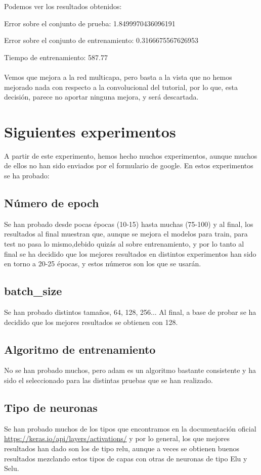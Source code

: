 Podemos ver los resultados obtenidos:

Error sobre el conjunto de prueba: 1.8499970436096191

Error sobre el conjunto de entrenamiento: 0.3166675567626953

Tiempo de entrenamiento: 587.77
\\\\

Vemos que mejora a la red multicapa, pero basta a la vista que no hemos mejorado nada con respecto a la convolucional del tutorial, por lo que, esta decisión, parece no aportar ninguna mejora, y será descartada.

\section{Siguientes experimentos}

A partir de este experimento, hemos hecho muchos experimentos, aunque muchos de ellos no han sido enviados por el formulario de google. En estos experimentos se ha probado:

\subsection{Número de epoch}

Se han probado desde pocas épocas (10-15) hasta muchas (75-100) y al final, los resultados al final muestran que, aunque se mejora el modelos para train, para test no pasa lo mismo,debido quizás al sobre entrenamiento, y por lo tanto al final se ha decidido que los mejores resultados en distintos experimentos han sido en torno a 20-25 épocas, y estos números son los que se usarán.

\subsection{batch\_size}

Se han probado distintos tamaños, 64, 128, 256... Al final, a base de probar se ha decidido que los mejores resultados se obtienen con 128.

\subsection{Algoritmo de entrenamiento}
No se han probado muchos, pero adam es un algoritmo bastante consistente y ha sido el seleccionado para las distintas pruebas que se han realizado.

\subsection{Tipo de neuronas}
Se han probado muchos de los tipos que encontramos en la documentación oficial \url{https://keras.io/api/layers/activations/} y por lo general, los que mejores resultados han dado son los de tipo relu, aunque a veces se obtienen buenos resultados mezclando estos tipos de capas con otras de neuronas de tipo Elu y Selu.


